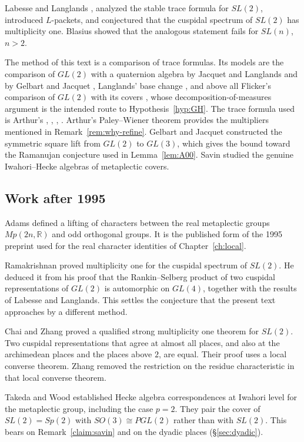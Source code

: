 \documentclass[12pt,letterpaper]{book}
\theoremstyle{plain}
\theoremstyle{definition}
\theoremstyle{remark}
\theoremstyle{remark}
\begin{document}
Labesse and Langlands \cite{LL}, \cite{Lab} analyzed the stable trace
formula for $SL(2)$, introduced $L$-packets, and conjectured that the
cuspidal spectrum of $SL(2)$ has multiplicity one. Blasius \cite{Blas}
showed that the analogous statement fails for $SL(n)$, $n>2$.

The method of this text is a comparison of trace formulas. Its models are
the comparison of $GL(2)$ with a quaternion algebra by Jacquet and
Langlands \cite{JL} and by Gelbart and Jacquet \cite{GJ}, Langlands' base
change \cite{L4}, and above all Flicker's comparison of $GL(2)$ with its
covers \cite{Fl}, whose decomposition-of-measures argument is the intended
route to Hypothesis~\ref{hyp:GH}. The trace formula used is Arthur's
\cite{A2}, \cite{A3}, \cite{A6}, \cite{A7}. Arthur's Paley--Wiener theorem
\cite{APW} provides the multipliers mentioned in
Remark~\ref{rem:why-refine}. Gelbart and Jacquet \cite{GJ78} constructed
the symmetric square lift from $GL(2)$ to $GL(3)$, which gives the bound
toward the Ramanujan conjecture used in Lemma~\ref{lem:A00}. Savin
\cite{Sav} studied the genuine Iwahori--Hecke algebras of metaplectic
covers.

\subsection*{Work after 1995}

Adams \cite{Ad2} defined a lifting of characters between the real
metaplectic groups $Mp(2n,{\mathbb R})$ and odd orthogonal groups. It is
the published form of the 1995 preprint used for the real character
identities of Chapter~\ref{ch:local}.

Ramakrishnan \cite{Ra} proved multiplicity one for the cuspidal spectrum
of $SL(2)$. He deduced it from his proof that the Rankin--Selberg product
of two cuspidal representations of $GL(2)$ is automorphic on $GL(4)$,
together with the results of Labesse and Langlands. This settles the
conjecture that the present text approaches by a different method.

Chai and Zhang \cite{CZ} proved a qualified strong multiplicity one
theorem for $SL(2)$. Two cuspidal representations that agree at almost all
places, and also at the archimedean places and the places above $2$, are
equal. Their proof uses a local converse theorem. Zhang \cite{Zh} removed
the restriction on the residue characteristic in that local converse
theorem.

Takeda and Wood \cite{TW} established Hecke algebra correspondences at
Iwahori level for the metaplectic group, including the case $p=2$. They
pair the cover of $SL(2)=Sp(2)$ with $SO(3)\cong PGL(2)$ rather than with
$SL(2)$. This bears on Remark~\ref{claim:savin} and on the dyadic places
(\S\ref{sec:dyadic}).
\end{document}
